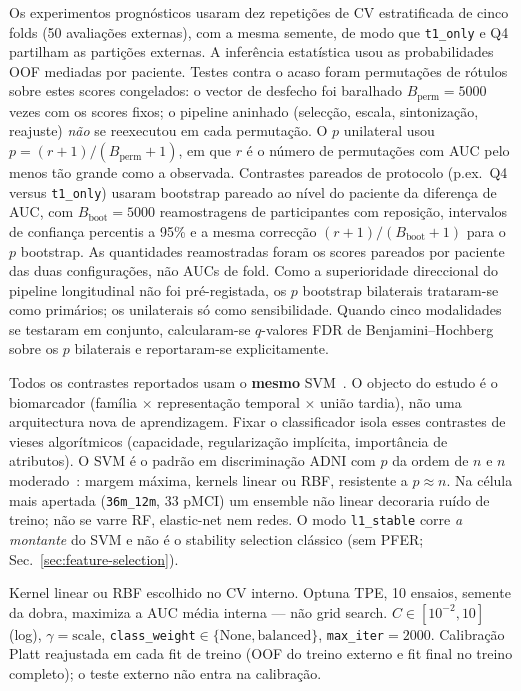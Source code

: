 \documentclass[review]{elsarticle}
\newcommand{\code}[1]{\texttt{#1}}
\begin{document}
Os experimentos prognósticos usaram dez repetições de CV estratificada de cinco folds (50 avaliações externas), com a mesma semente, de modo que \code{t1\_only} e Q4 partilham as partições externas.
A inferência estatística usou as probabilidades OOF mediadas por paciente.
Testes contra o acaso foram permutações de rótulos sobre estes scores congelados: o vector de desfecho foi baralhado $B_{\mathrm{perm}}=5000$ vezes com os scores fixos; o pipeline aninhado (selecção, escala, sintonização, reajuste) \emph{não} se reexecutou em cada permutação.
O $p$ unilateral usou $p=(r+1)/(B_{\mathrm{perm}}+1)$, em que $r$ é o número de permutações com AUC pelo menos tão grande como a observada.
Contrastes pareados de protocolo (p.ex.\ Q4 versus \code{t1\_only}) usaram bootstrap pareado ao nível do paciente da diferença de AUC, com $B_{\mathrm{boot}}=5000$ reamostragens de participantes com reposição, intervalos de confiança percentis a 95\% e a mesma correcção $(r+1)/(B_{\mathrm{boot}}+1)$ para o $p$ bootstrap.
As quantidades reamostradas foram os scores pareados por paciente das duas configurações, não AUCs de fold.
Como a superioridade direccional do pipeline longitudinal não foi pré-registada, os $p$ bootstrap bilaterais trataram-se como primários; os unilaterais só como sensibilidade.
Quando cinco modalidades se testaram em conjunto, calcularam-se $q$-valores FDR de Benjamini--Hochberg sobre os $p$ bilaterais e reportaram-se explicitamente.


Todos os contrastes reportados usam o \textbf{mesmo} SVM~\cite{cortes-1995}.
O objecto do estudo é o biomarcador (família $\times$ representação temporal $\times$ união tardia), não uma arquitectura nova de aprendizagem.
Fixar o classificador isola esses contrastes de vieses algorítmicos (capacidade, regularização implícita, importância de atributos).
O SVM é o padrão em discriminação ADNI com $p$ da ordem de $n$ e $n$ moderado~\cite{cuingnet-2011}: margem máxima, kernels linear ou RBF, resistente a $p\approx n$.
Na célula mais apertada (\code{36m\_12m}, 33 pMCI) um ensemble não linear decoraria ruído de treino; não se varre RF, elastic-net nem redes.
O modo \code{l1\_stable} corre \emph{a montante} do SVM e não é o stability selection clássico (sem PFER; Sec.~\ref{sec:feature-selection}).

Kernel linear ou RBF escolhido no CV interno.
Optuna TPE, 10 ensaios, semente da dobra, maximiza a AUC média interna --- não grid search.
$C\in[10^{-2},10]$ (log), $\gamma=\mathrm{scale}$, \code{class\_weight}$\in\{\mathrm{None},\mathrm{balanced}\}$, \code{max\_iter}$=2000$.
Calibração Platt reajustada em cada fit de treino (OOF do treino externo e fit final no treino completo); o teste externo não entra na calibração.
\end{document}
